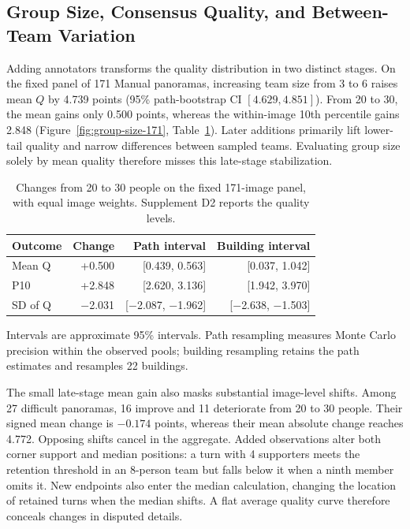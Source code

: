 \subsection{Group Size, Consensus Quality, and Between-Team Variation}
\label{sec:group-size}

Adding annotators transforms the quality distribution in two distinct stages. On the fixed panel of 171 Manual panoramas, increasing team size from 3 to 6 raises mean $Q$ by 4.739 points (95\% path-bootstrap CI $[4.629,4.851]$). From 20 to 30, the mean gains only 0.500 points, whereas the within-image 10th percentile gains 2.848 (Figure~\ref{fig:group-size-171}, Table~\ref{tab:group-size-intervals}). Later additions primarily lift lower-tail quality and narrow differences between sampled teams. Evaluating group size solely by mean quality therefore misses this late-stage stabilization.



\begin{table}[t]
\centering\small
\caption{Changes from 20 to 30 people on the fixed 171-image panel, with equal image weights. Supplement D2 reports the quality levels.}
\label{tab:group-size-milestones}
\label{tab:group-size-intervals}
\setlength{\tabcolsep}{3pt}
\begin{tabular}{@{}lrrr@{}}
\toprule
Outcome & Change & Path interval & Building interval\\
\midrule
Mean Q & +0.500 & [0.439, 0.563] & [0.037, 1.042]\\
P10 & +2.848 & [2.620, 3.136] & [1.942, 3.970]\\
SD of Q & $-$2.031 & [$-$2.087, $-$1.962] & [$-$2.638, $-$1.503]\\
\bottomrule
\end{tabular}
\par\smallskip
\parbox{\columnwidth}{\footnotesize Intervals are approximate 95\% intervals. Path resampling measures Monte Carlo precision within the observed pools; building resampling retains the path estimates and resamples 22 buildings.}
\end{table}

The small late-stage mean gain also masks substantial image-level shifts. Among 27 difficult panoramas, 16 improve and 11 deteriorate from 20 to 30 people. Their signed mean change is $-0.174$ points, whereas their mean absolute change reaches 4.772. Opposing shifts cancel in the aggregate. Added observations alter both corner support and median positions: a turn with 4 supporters meets the retention threshold in an 8-person team but falls below it when a ninth member omits it. New endpoints also enter the median calculation, changing the location of retained turns when the median shifts. A flat average quality curve therefore conceals changes in disputed details.

